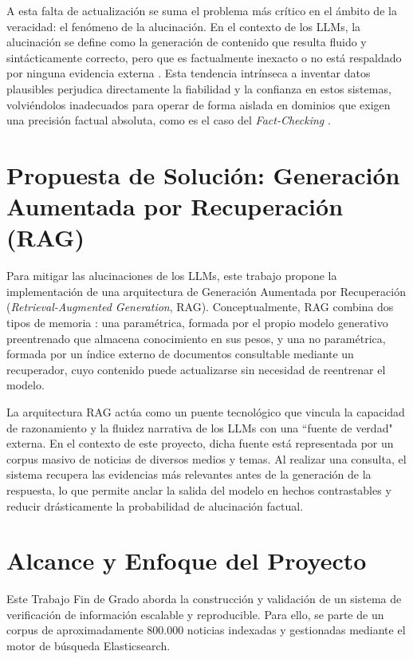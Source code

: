A esta falta de actualización se suma el problema más crítico en el ámbito de la veracidad: el fenómeno de la alucinación. En el contexto de los LLMs, la alucinación se define como la generación de contenido que resulta fluido y sintácticamente correcto, pero que es factualmente inexacto o no está respaldado por ninguna evidencia externa \cite{alansari2025hallucination}. Esta tendencia intrínseca a inventar datos plausibles perjudica directamente la fiabilidad y la confianza en estos sistemas, volviéndolos inadecuados para operar de forma aislada en dominios que exigen una precisión factual absoluta, como es el caso del \textit{Fact-Checking} \cite{alansari2025hallucination}.

\section{Propuesta de Solución: Generación Aumentada por Recuperación (RAG)}

Para mitigar las alucinaciones de los LLMs, este trabajo propone la implementación de una arquitectura de Generación Aumentada por Recuperación (\textit{Retrieval-Augmented Generation}, RAG). Conceptualmente, RAG combina dos tipos de memoria \cite{lewis2020rag}: una paramétrica, formada por el propio modelo generativo preentrenado que almacena conocimiento en sus pesos, y una no paramétrica, formada por un índice externo de documentos consultable mediante un recuperador, cuyo contenido puede actualizarse sin necesidad de reentrenar el modelo.

La arquitectura RAG actúa como un puente tecnológico que vincula la capacidad de razonamiento y la fluidez narrativa de los LLMs con una ``fuente de verdad" externa. En el contexto de este proyecto, dicha fuente está representada por un corpus masivo de noticias de diversos medios y temas. Al realizar una consulta, el sistema recupera las evidencias más relevantes antes de la generación de la respuesta, lo que permite anclar la salida del modelo en hechos contrastables y reducir drásticamente la probabilidad de alucinación factual.

\section{Alcance y Enfoque del Proyecto}

Este Trabajo Fin de Grado aborda la construcción y validación de un sistema de verificación de información escalable y reproducible. Para ello, se parte de un corpus de aproximadamente 800.000 noticias indexadas y gestionadas mediante el motor de búsqueda Elasticsearch.

